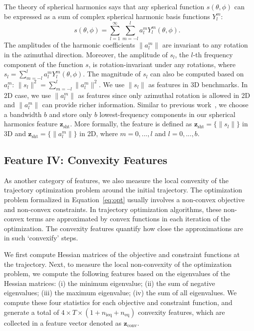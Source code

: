 \documentclass[letterpaper, 10 pt, conference]{ieeeconf}  %
\newcommand{\fsht}{\mbox{$\mathbf z_{\text{sht}}$}}
\newcommand{\fconv}{\mbox{$\mathbf z_{\text{conv}}$}}
\begin{document}
The theory of spherical harmonics says that any spherical function $s(\theta, \phi)$ can be expressed as a sum of complex spherical harmonic basis functions $Y_l^m$: 
\begin{equation}
s(\theta, \phi) = \sum_{l=1}^{\infty} \sum_{m=-l}^{l} a_l^m Y_l^m(\theta, \phi).
\end{equation}
The amplitudes of the harmonic coefficients $\|a_l^m\|$ are invariant to any rotation in the azimuthal direction. Moreover, the amplitude of $s_l$, the $l$-th frequency component of the function $s$, is rotation-invariant under any rotations, where $s_l = \sum_{m=-l}^{l}a_l^m Y_l^m(\theta, \phi)$. The magnitude of $s_l$ can also be computed based on $a_l^m$: $\|s_l\|^2 = \sum_{m=-l}^l \|a_l^m\|^2$. We use $\|s_l\|$ as features in 3D benchmarks. In 2D case, we use $\|a_l^m\|$ as features since only azimuthal rotation is allowed in 2D and $\|a_l^m\|$ can provide richer information. Similar to previous work~\cite{Frome:2004:ROR,Kazhdan:2003:RIS}, we choose a bandwidth $b$ and store only $b$ lowest-frequency components in our spherical harmonics feature $\fsht$. More formally, the feature is defined as $\fsht = \{\|s_l\|\}$ in 3D and $\fsht = \{\|a_l^m\|\}$ in 2D, where $m = 0,...,l$ and $l = 0,...,b$.


\subsection{Feature IV: Convexity Features}
As another category of features, we also measure the local convexity of the trajectory optimization problem around the initial trajectory. 
The optimization problem formalized in Equation~\ref{eq:opt} usually involves a non-convex objective and non-convex constraints. In trajectory optimization algorithms, these non-convex terms are approximated by convex functions in each iteration of the optimization. The convexity features quantify how close the approximations are in such `convexify' steps.

We first compute Hessian matrices of the objective and constraint functions at the trajectory. Next, to measure the local non-convexity of the optimization problem, we compute the following features based on the eigenvalues of the Hessian matrices: (i) the minimum eigenvalue; (ii) the sum of negative eigenvalues; (iii) the maximum eigenvalue; (iv) the sum of all eigenvalues. We compute these four statistics for each objective and constraint function, and generate a total of $4 \times T \times (1 + n_{\text{ieq}} + n_{\text{eq}})$ convexity features, which are collected in a feature vector denoted as $\fconv$.
\end{document}
